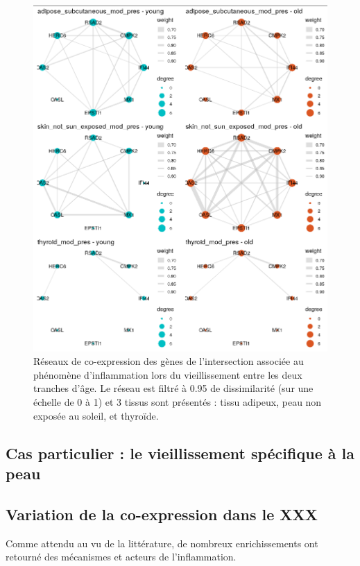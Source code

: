 \begin{figure}[b]
    \centering
    \includegraphics[width=1\textwidth]{img/chap2/chap2_graphs_intersection_plot_adipo_skinnosun_thyr.png}
    \caption{Réseaux de co-expression des gènes de l'intersection associée au phénomène d'inflammation lors du vieillissement entre les deux tranches d'âge. Le réseau est filtré à 0.95 de dissimilarité (sur une échelle de 0 à 1) et 3 tissus sont présentés : tissu adipeux, peau non exposée au soleil, et thyroïde.}
    \label{figure:graphs_intersection_plot_adipo_skinnosun_thyr}
\end{figure}



\subsection{Cas particulier : le vieillissement spécifique à la peau}



\subsection{Variation de la co-expression dans le XXX}
Comme attendu au vu de la littérature, de nombreux enrichissements ont retourné des mécanismes et acteurs de l'inflammation. 




